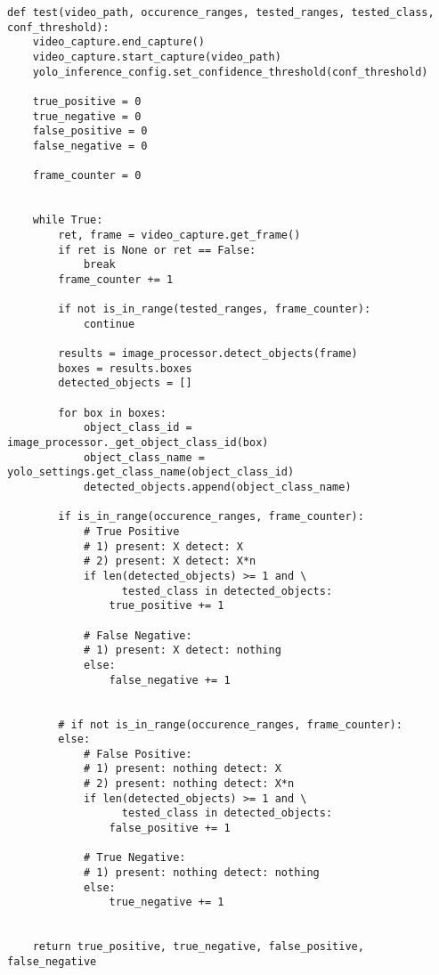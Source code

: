 \begin{lstlisting}[caption={Funkcja generująca metryki do testów}, label={lst:generate_accuracy_results}]
def test(video_path, occurence_ranges, tested_ranges, tested_class, conf_threshold):
    video_capture.end_capture()
    video_capture.start_capture(video_path)
    yolo_inference_config.set_confidence_threshold(conf_threshold)

    true_positive = 0
    true_negative = 0
    false_positive = 0
    false_negative = 0

    frame_counter = 0
    

    while True:
        ret, frame = video_capture.get_frame()
        if ret is None or ret == False:
            break
        frame_counter += 1

        if not is_in_range(tested_ranges, frame_counter):
            continue

        results = image_processor.detect_objects(frame)
        boxes = results.boxes
        detected_objects = []

        for box in boxes:
            object_class_id = image_processor._get_object_class_id(box)
            object_class_name = yolo_settings.get_class_name(object_class_id)
            detected_objects.append(object_class_name)

        if is_in_range(occurence_ranges, frame_counter):
            # True Positive
            # 1) present: X detect: X
            # 2) present: X detect: X*n
            if len(detected_objects) >= 1 and \
                  tested_class in detected_objects:
                true_positive += 1

            # False Negative:
            # 1) present: X detect: nothing
            else:
                false_negative += 1


        # if not is_in_range(occurence_ranges, frame_counter):
        else:
            # False Positive:
            # 1) present: nothing detect: X
            # 2) present: nothing detect: X*n
            if len(detected_objects) >= 1 and \
                  tested_class in detected_objects:
                false_positive += 1

            # True Negative:
            # 1) present: nothing detect: nothing
            else:
                true_negative += 1
    

    return true_positive, true_negative, false_positive, false_negative
\end{lstlisting}